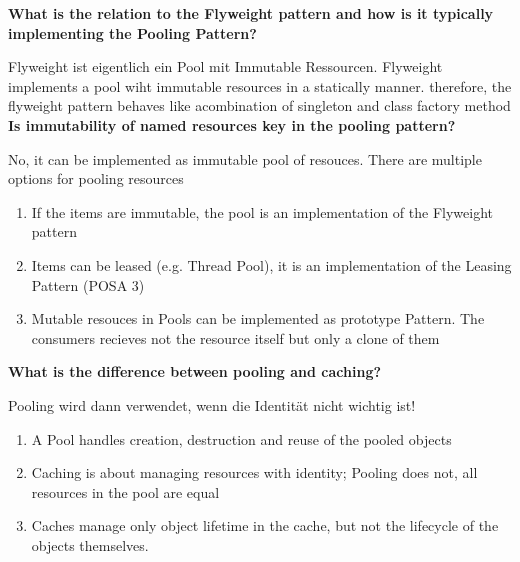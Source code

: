 \textbf{What is the relation to the Flyweight pattern and how is it typically implementing the Pooling Pattern?}

Flyweight ist eigentlich ein Pool mit Immutable Ressourcen. Flyweight implements a pool wiht immutable resources in a statically manner. therefore, the flyweight pattern behaves like acombination of singleton and class factory method \\

\textbf{Is immutability of named resources key in the pooling pattern?}

No, it can be implemented as immutable pool of resouces. There are multiple options for pooling resources

\begin{enumerate}
    \item If the items are immutable, the pool is an implementation of the Flyweight pattern
    \item Items can be leased (e.g. Thread Pool), it is an implementation of the Leasing Pattern (POSA 3)
    \item Mutable resouces in Pools can be implemented as prototype Pattern. The consumers recieves not the resource itself but only a clone of them
\end{enumerate}
\vspace{10pt}
\textbf{What is the difference between pooling and caching?}

Pooling wird dann verwendet, wenn die Identität nicht wichtig ist!

\begin{enumerate}
    \item A Pool handles creation, destruction and reuse of the pooled objects
    \item Caching is about managing resources with identity; Pooling does not, all resources in the pool are equal
    \item Caches manage only object lifetime in the cache, but not the lifecycle of the objects themselves.
\end{enumerate}
